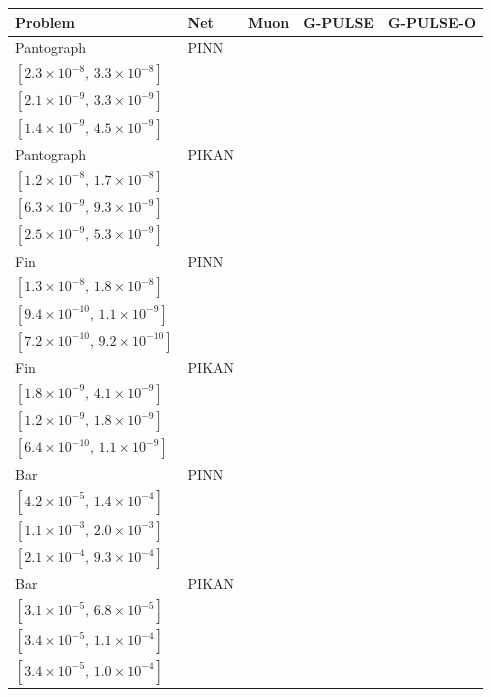 \begin{tabular}{llccc}
\toprule
Problem & Net & Muon & G-PULSE & G-PULSE-O\\
\midrule
Pantograph & PINN & \makecell{$2.8{\times}10^{-8}$\\$[2.3{\times}10^{-8},\,3.3{\times}10^{-8}]$} & \makecell{$2.6{\times}10^{-9}$\\$[2.1{\times}10^{-9},\,3.3{\times}10^{-9}]$} & \makecell{$\mathbf{2.5{\times}10^{-9}}$\\$[1.4{\times}10^{-9},\,4.5{\times}10^{-9}]$}\\
Pantograph & PIKAN & \makecell{$1.4{\times}10^{-8}$\\$[1.2{\times}10^{-8},\,1.7{\times}10^{-8}]$} & \makecell{$7.7{\times}10^{-9}$\\$[6.3{\times}10^{-9},\,9.3{\times}10^{-9}]$} & \makecell{$\mathbf{3.6{\times}10^{-9}}$\\$[2.5{\times}10^{-9},\,5.3{\times}10^{-9}]$}\\
Fin & PINN & \makecell{$1.5{\times}10^{-8}$\\$[1.3{\times}10^{-8},\,1.8{\times}10^{-8}]$} & \makecell{$1.0{\times}10^{-9}$\\$[9.4{\times}10^{-10},\,1.1{\times}10^{-9}]$} & \makecell{$\mathbf{8.1{\times}10^{-10}}$\\$[7.2{\times}10^{-10},\,9.2{\times}10^{-10}]$}\\
Fin & PIKAN & \makecell{$2.7{\times}10^{-9}$\\$[1.8{\times}10^{-9},\,4.1{\times}10^{-9}]$} & \makecell{$1.5{\times}10^{-9}$\\$[1.2{\times}10^{-9},\,1.8{\times}10^{-9}]$} & \makecell{$\mathbf{8.3{\times}10^{-10}}$\\$[6.4{\times}10^{-10},\,1.1{\times}10^{-9}]$}\\
Bar & PINN & \makecell{$\mathbf{7.6{\times}10^{-5}}$\\$[4.2{\times}10^{-5},\,1.4{\times}10^{-4}]$} & \makecell{$1.5{\times}10^{-3}$\\$[1.1{\times}10^{-3},\,2.0{\times}10^{-3}]$} & \makecell{$4.5{\times}10^{-4}$\\$[2.1{\times}10^{-4},\,9.3{\times}10^{-4}]$}\\
Bar & PIKAN & \makecell{$\mathbf{4.6{\times}10^{-5}}$\\$[3.1{\times}10^{-5},\,6.8{\times}10^{-5}]$} & \makecell{$6.0{\times}10^{-5}$\\$[3.4{\times}10^{-5},\,1.1{\times}10^{-4}]$} & \makecell{$5.8{\times}10^{-5}$\\$[3.4{\times}10^{-5},\,1.0{\times}10^{-4}]$}\\

\end{tabular}
